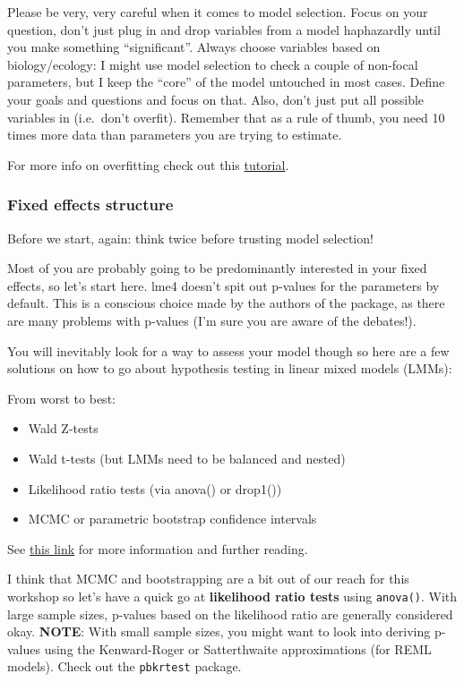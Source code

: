 \documentclass[
]{article}
\providecommand{\tightlist}{%
  \setlength{\itemsep}{0pt}\setlength{\parskip}{0pt}}
\begin{document}
Please be very, very careful when it comes to model selection. Focus on
your question, don't just plug in and drop variables from a model
haphazardly until you make something ``significant''. Always choose
variables based on biology/ecology: I might use model selection to check
a couple of non-focal parameters, but I keep the ``core'' of the model
untouched in most cases. Define your goals and questions and focus on
that. Also, don't just put all possible variables in (i.e.~don't
overfit). Remember that as a rule of thumb, you need 10 times more data
than parameters you are trying to estimate.

For more info on overfitting check out this
\href{https://ourcodingclub.github.io/tutorials/modelling/}{tutorial}.

\subsubsection{Fixed effects structure}\label{fixed-effects-structure}

Before we start, again: think twice before trusting model selection!

Most of you are probably going to be predominantly interested in your
fixed effects, so let's start here. lme4 doesn't spit out p-values for
the parameters by default. This is a conscious choice made by the
authors of the package, as there are many problems with p-values (I'm
sure you are aware of the debates!).

You will inevitably look for a way to assess your model though so here
are a few solutions on how to go about hypothesis testing in linear
mixed models (LMMs):

From worst to best:

\begin{itemize}
\tightlist
\item
  Wald Z-tests
\item
  Wald t-tests (but LMMs need to be balanced and nested)
\item
  Likelihood ratio tests (via anova() or drop1())
\item
  MCMC or parametric bootstrap confidence intervals
\end{itemize}

See
\href{http://stats.stackexchange.com/questions/95054/how-to-get-an-overall-p-value-and-effect-size-for-a-categorical-factor-in-a-mi}{this
link} for more information and further reading.

I think that MCMC and bootstrapping are a bit out of our reach for this
workshop so let's have a quick go at \textbf{likelihood ratio tests}
using \texttt{anova()}. With large sample sizes, p-values based on the
likelihood ratio are generally considered okay. \textbf{NOTE}: With
small sample sizes, you might want to look into deriving p-values using
the Kenward-Roger or Satterthwaite approximations (for REML models).
Check out the \texttt{pbkrtest} package.
\end{document}
